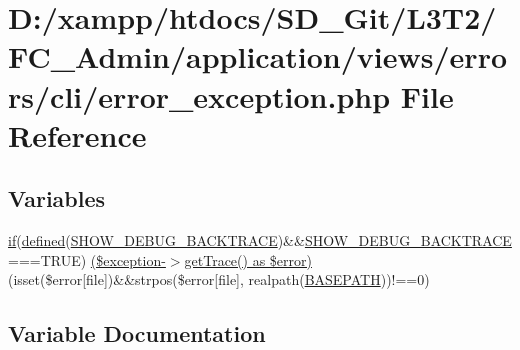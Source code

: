 \hypertarget{_admin_2application_2views_2errors_2cli_2error__exception_8php}{}\section{D\+:/xampp/htdocs/\+S\+D\+\_\+\+Git/\+L3\+T2/\+F\+C\+\_\+\+Admin/application/views/errors/cli/error\+\_\+exception.php File Reference}
\label{_admin_2application_2views_2errors_2cli_2error__exception_8php}
\subsection*{Variables}
\begin{DoxyCompactItemize}
\item 
\hyperlink{_admin_2assets_2js_2bootstrap_8min_8js_a87cf461060832b8b68a7b48d9e371e4f}{if}(\hyperlink{_admin_2tests_2_bootstrap_8php_a46458e8654a714e0565e20f63021add9}{defined}(\textquotesingle{}\hyperlink{_admin_2application_2config_2constants_8php_a7e2dd6fea73799257285946411aeb5ce}{S\+H\+O\+W\+\_\+\+D\+E\+B\+U\+G\+\_\+\+B\+A\+C\+K\+T\+R\+A\+C\+E}\textquotesingle{})\&\&\hyperlink{_admin_2application_2config_2constants_8php_a7e2dd6fea73799257285946411aeb5ce}{S\+H\+O\+W\+\_\+\+D\+E\+B\+U\+G\+\_\+\+B\+A\+C\+K\+T\+R\+A\+C\+E}===T\+R\+U\+E) \hyperlink{_admin_2application_2views_2errors_2cli_2error__exception_8php_a58b3444cff3fa104c28c2111a147e3d3}{(\$exception-\/$>$get\+Trace() as \$error)} (isset(\$error\mbox{[}\textquotesingle{}file\textquotesingle{}\mbox{]})\&\&strpos(\$error\mbox{[}\textquotesingle{}file\textquotesingle{}\mbox{]}, realpath(\hyperlink{_admin_2index_8php_ad39801cabfd338dc5524466fe793fda9}{B\+A\+S\+E\+P\+A\+T\+H}))!==0)
\end{DoxyCompactItemize}


\subsection{Variable Documentation}
\hypertarget{_admin_2application_2views_2errors_2cli_2error__exception_8php_a58b3444cff3fa104c28c2111a147e3d3}{}
